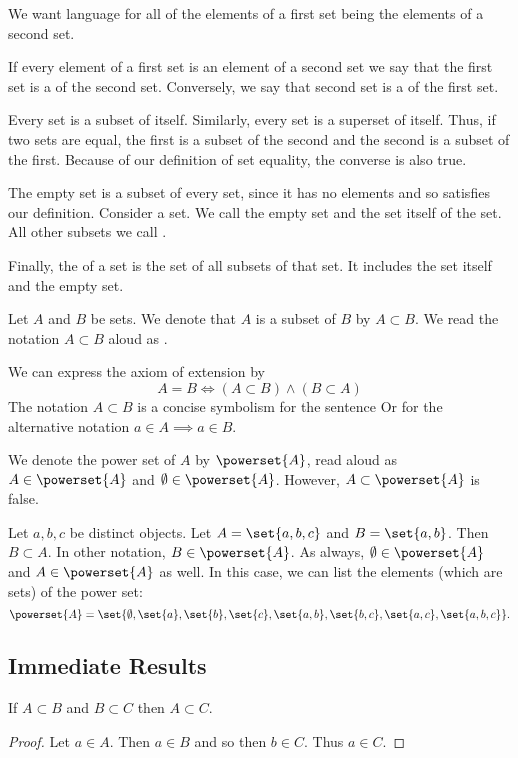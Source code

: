 
\sbasic





\sstart
{}


We want language for
all of the elements
of a first set being
the elements of a second set.


If every element
of a first set is
an element of a
second set we say
that the first set
is a 
of the second set.
Conversely, we say that
second set is a
 of
the first set.

Every set is a subset of itself.
Similarly, every set is a
superset of itself.
Thus, if two sets are equal,
the first is a subset of the
second and the second is
a subset of the first.
Because of our definition
of set equality, the converse
is also true.

The empty set is a subset of every set,
since it has no elements and so satisfies
our definition.
Consider a set.
We call the empty set and the set itself
of the set.
All other subsets we call
.


Finally, the 
of a set is the set of all subsets of that
set.
It includes the set itself and the empty set.

Let $A$ and $B$ be sets.
We denote that $A$ is a subset of $B$ by $A \subset B$.
We read the notation $A \subset B$ aloud as .

We can express the axiom of extension by
\[
  A = B \Leftrightarrow (A \subset B) \land (B \subset A)
\]
The notation $A \subset B$
is a concise symbolism for
the sentence
 Or for the alternative notation
$a \in A \implies a \in B$.


We denote the power set of $A$ by $\powerset{A}$, read aloud as 
$A \in \powerset{A}$ and $\emptyset \in \powerset{A}$.
However, $A \subset \powerset{A}$ is false.


Let $a, b, c$ be distinct
objects. Let $A = \set{a, b ,c}$
and $B = \set{a, b}$. Then
$B \subset A$.
In other notation,
$B \in \powerset{A}$.
As always, $\emptyset \in \powerset{A}$
and $A \in \powerset{A}$ as well.
In this case, we can
list the elements (which are sets)
of the power set:
\[
  \powerset{A} = \set{
    \emptyset,
    \set{a},
    \set{b},
    \set{c},
    \set{a, b},
    \set{b, c},
    \set{a, c},
    \set{a, b, c}
  }.
\]

\subsection{Immediate Results}

\begin{prop}
If $A \subset B$ and $B \subset C$ then $A \subset C$.
\begin{proof}
  Let $a \in A$. Then $a \in B$ and so then $b \in C$.
  Thus $a \in C$.
\end{proof}
\end{prop}
\strats

